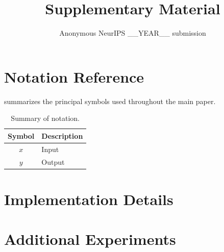 \documentclass{article}
\begin{document}
\title{Supplementary Material}
\author{Anonymous NeurIPS __YEAR__ submission}
\maketitle

\setcounter{page}{1}

\section{Notation Reference}
\label{sec:supp_notation}

 summarizes the principal symbols used throughout the main paper.

\begin{table}[t]
\centering
\caption{Summary of notation.}
\label{tab:notation}
\renewcommand{\arraystretch}{1.15}
\begin{tabular}{@{}cl@{}}
\toprule
\textbf{Symbol} & \textbf{Description} \\
\midrule
$x$             & Input \\
$y$             & Output \\
\bottomrule
\end{tabular}
\end{table}

\section{Implementation Details}
\label{sec:supp_impl}


\section{Additional Experiments}
\label{sec:supp_experiments}

\end{document}
